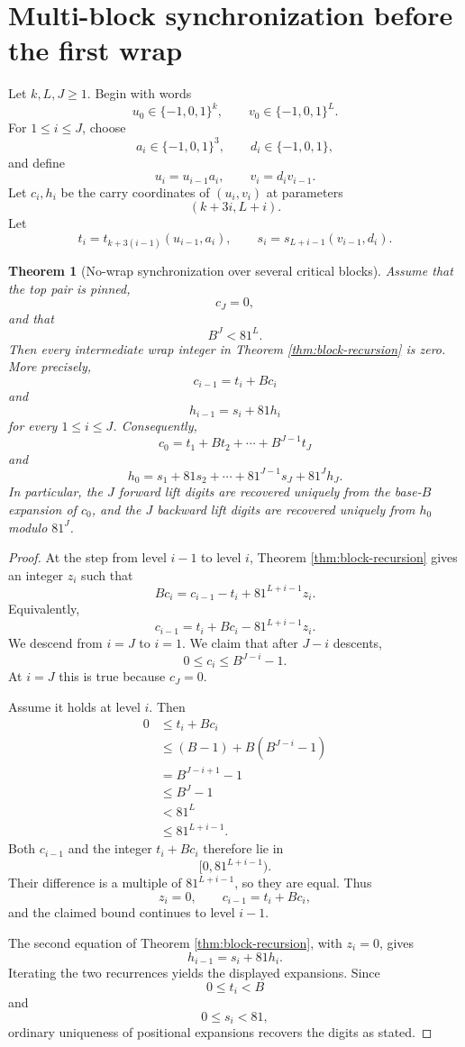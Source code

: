 \documentclass[11pt]{article}
\newtheorem{theorem}{Theorem}[section]
\theoremstyle{remark}
\newcommand{\E}{\{-1,0,1\}}
\begin{document}
\section{Multi-block synchronization before the first wrap}

Let $k,L,J\ge1$.  Begin with words
\[
u_0\in\E^k,
\qquad
v_0\in\E^L.
\]
For $1\le i\le J$, choose
\[
a_i\in\E^3,
\qquad
d_i\in\E,
\]
and define
\[
u_i=u_{i-1}a_i,
\qquad
v_i=d_iv_{i-1}.
\]
Let $c_i,h_i$ be the carry coordinates of $(u_i,v_i)$ at parameters
\[
(k+3i,L+i).
\]
Let
\[
t_i=t_{k+3(i-1)}(u_{i-1},a_i),
\qquad
s_i=s_{L+i-1}(v_{i-1},d_i).
\]

\begin{theorem}[No-wrap synchronization over several critical blocks]
\label{thm:nowrap}
Assume that the top pair is pinned,
\[
c_J=0,
\]
and that
\[
B^J<81^L.
\]
Then every intermediate wrap integer in Theorem \ref{thm:block-recursion} is zero.  More precisely,
\[
c_{i-1}=t_i+Bc_i
\]
and
\[
h_{i-1}=s_i+81h_i
\]
for every $1\le i\le J$.  Consequently,
\[
c_0=t_1+Bt_2+\cdots+B^{J-1}t_J
\]
and
\[
h_0=s_1+81s_2+\cdots+81^{J-1}s_J+81^Jh_J.
\]
In particular, the $J$ forward lift digits are recovered uniquely from the base-$B$ expansion of $c_0$, and the $J$ backward lift digits are recovered uniquely from $h_0$ modulo $81^J$.
\end{theorem}

\begin{proof}
At the step from level $i-1$ to level $i$, Theorem \ref{thm:block-recursion} gives an integer $z_i$ such that
\[
Bc_i=c_{i-1}-t_i+81^{L+i-1}z_i.
\]
Equivalently,
\[
c_{i-1}=t_i+Bc_i-81^{L+i-1}z_i.
\]
We descend from $i=J$ to $i=1$.  We claim that after $J-i$ descents,
\[
0\le c_i\le B^{J-i}-1.
\]
At $i=J$ this is true because $c_J=0$.

Assume it holds at level $i$.  Then
\begin{align*}
0
&\le t_i+Bc_i\\
&\le (B-1)+B(B^{J-i}-1)\\
&=B^{J-i+1}-1\\
&\le B^J-1\\
&<81^L\\
&\le81^{L+i-1}.
\end{align*}
Both $c_{i-1}$ and the integer $t_i+Bc_i$ therefore lie in
\[
[0,81^{L+i-1}).
\]
Their difference is a multiple of $81^{L+i-1}$, so they are equal.  Thus
\[
z_i=0,
\qquad
c_{i-1}=t_i+Bc_i,
\]
and the claimed bound continues to level $i-1$.

The second equation of Theorem \ref{thm:block-recursion}, with $z_i=0$, gives
\[
h_{i-1}=s_i+81h_i.
\]
Iterating the two recurrences yields the displayed expansions.  Since
\[
0\le t_i<B
\]
and
\[
0\le s_i<81,
\]
ordinary uniqueness of positional expansions recovers the digits as stated.
\end{proof}
\end{document}
